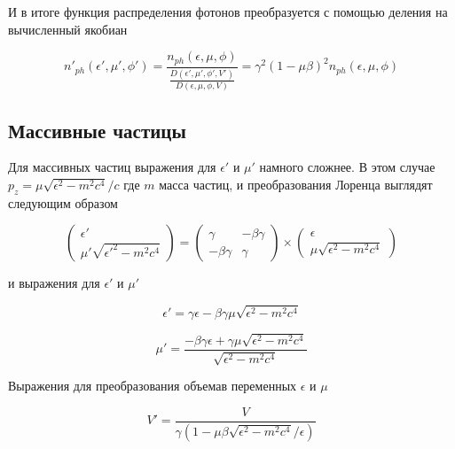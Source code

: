 И в итоге функция распределения фотонов преобразуется с помощью деления на вычисленный якобиан

\begin{equation}\label{distribution_ph}
	n'_{ph}(\epsilon',\mu',\phi') = \frac{n_{ph}(\epsilon,\mu,\phi)}{\frac{D(\epsilon',\mu',\phi',V')}{D(\epsilon,\mu,\phi,V)}}=\gamma^2(1-\mu\beta)^2 n_{ph}(\epsilon,\mu,\phi)
\end{equation}

\subsection{Массивные частицы}

Для массивных частиц выражения для $\epsilon'$ и $\mu'$ намного сложнее. В этом случае $p_z = \mu \sqrt{\epsilon^2 - m^2 c^4}/c$ где $m$ масса частиц, и преобразования Лоренца выглядят следующим образом

\begin{equation}\label{lorentz_m}
\left(\begin{array}{c}
\epsilon'\\
\mu'\sqrt{{\epsilon'}^2 - m^2 c^4}
\end{array}
\right)
= \left(
\begin{array}{cc}
\gamma & -\beta\gamma\\
-\beta\gamma & \gamma
\end{array}
\right)
\times
\left(\begin{array}{c}
\epsilon\\
\mu\sqrt{{\epsilon}^2-m^2 c^4}
\end{array}
\right)
\end{equation}

и выражения для $\epsilon'$ и $\mu'$

\begin{equation}
\epsilon' = \gamma\epsilon-\beta\gamma\mu\sqrt{\epsilon^2-m^2 c^4}
\end{equation}

\begin{equation}
\mu' = \frac{-\beta\gamma\epsilon+\gamma\mu\sqrt{{\epsilon}^2-m^2 c^4}}{\sqrt{{\epsilon^2 - m^2 c^4}}}
\end{equation}

Выражения для преобразования объемав переменных $\epsilon$ и $\mu$

\begin{equation}
V'=\frac{V}{\gamma(1-\mu\beta\sqrt{{\epsilon}^2-m^2 c^4}/\epsilon)}
\end{equation}

